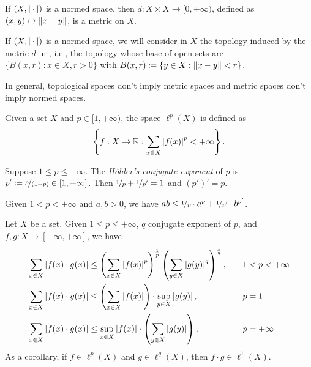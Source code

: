 \documentclass[screen]{techreport}
\numberwithin{equation}{section}
\begin{document}
\begin{proposition}\label{Prop:NormInduceMetric}
	If $(X,\left\|{\cdot}\right\|)$ is a normed space, then $d : X \times X \to [0,+\infty)$, defined as $(x,y) \mapsto \left\|{x-y}\right\|$, is a metric on $X$.
\end{proposition}

\begin{remark}\label{Rem:NormedBalls}
	If $(X,\left\|{\cdot}\right\|)$ is a normed space, we will consider in $X$ the topology induced by the metric $d$ in , i.e., the topology whose base of open sets are $\{ B(x,r) : x \in X, r > 0 \}$ with $B(x,r) \coloneqq \{ y \in X : \left\|{x-y}\right\| < r \}$.
\end{remark}

\begin{remark}\label{Rem:MetricNotImplyNorm}
	In general, topological spaces don't imply metric spaces and metric spaces don't imply normed spaces.
\end{remark}

\begin{definition}\label{De:lpSpaces}
	Given a set $X$ and $p \in [1,+\infty)$, the space $\ell^p(X)$ is defined as
	\begin{equation}
		\left\{ { f : X \to \mathbb{R} : \sum_{x \in X} \left|{f(x)}\right|^p < +\infty } \right\}.
	\end{equation}
\end{definition}

\begin{definition}\label{De:HoldersConjugateExponent}
	Suppose $1 \le p \le +\infty$.
	The \emph{H{\"o}lder's conjugate exponent} of $p$ is $p' \coloneqq \nicefrac{p}{(1-p)} \in [1,+\infty]$.
	Then $\nicefrac{1}{p} + \nicefrac{1}{p'}=1$ and $(p')' = p$.
\end{definition}

\begin{theorem}\label{The:YangsInequality}
	Given $1 < p < +\infty$ and $a,b > 0$, we have $ab \le \nicefrac{1}{p}  \cdot a^p + \nicefrac{1}{p'} \cdot b^{p'}$.
\end{theorem}

\begin{theorem}\label{The:HoldersInequality}
	Let $X$ be a set.
	Given $1 \le p \le +\infty$, $q$ conjugate exponent of $p$, and $f,g: X \to [-\infty,+\infty]$, we have
	\begin{alignat}{2}
		\sum_{x \in X} \left|{f(x) \cdot g(x)}\right| & \le  \left({ \sum_{x \in X} \left|{f(x)}\right|^p }\right)^{\frac{1}{p}} \left({  \sum_{y \in X} \left|{g(y)}\right|^q }\right)^{\frac{1}{q}}, \quad &&  1 < p < +\infty \\
		\sum_{x \in X} \left|{f(x) \cdot g(x)}\right| & \le \left({ \sum_{x \in X} \left|{f(x)}\right| }\right) \cdot \sup_{y \in X} \left|{g(y)}\right|, \quad &&  p=1 \\
		\sum_{x \in X} \left|{f(x) \cdot g(x)}\right| & \le \sup_{x \in X} \left|{f(x)}\right| \cdot \left({ \sum_{y \in X} \left|{g(y)}\right| }\right), \quad && p=+\infty
	\end{alignat}
	As a corollary, if $f \in \ell^p(X)$ and $g \in \ell^q(X)$, then $f \cdot g \in \ell^1(X)$.
\end{theorem}
\end{document}
